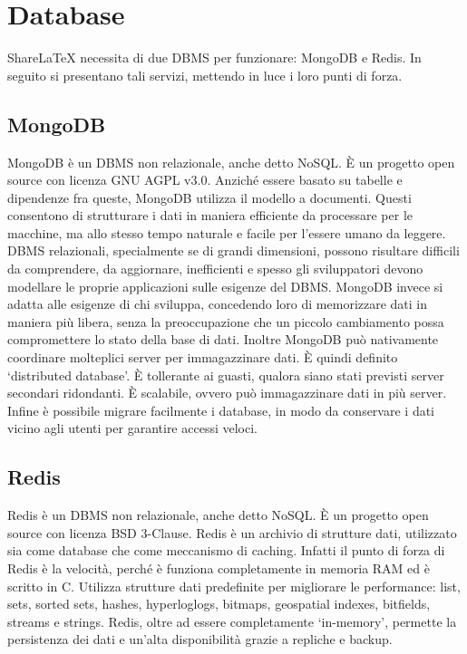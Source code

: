 \section{Database}
ShareLaTeX necessita di due DBMS per funzionare: MongoDB e Redis. In seguito si presentano tali servizi, mettendo in luce i loro punti di forza.

\subsection{MongoDB}
MongoDB è un DBMS non relazionale, anche detto NoSQL. È un progetto open source con licenza GNU AGPL v3.0. Anziché essere basato su tabelle e dipendenze fra queste, MongoDB utilizza il modello a documenti. Questi consentono di strutturare i dati in maniera efficiente da processare per le macchine, ma allo stesso tempo naturale e facile per l'essere umano da leggere. DBMS relazionali, specialmente se di grandi dimensioni, possono risultare difficili da comprendere, da aggiornare, inefficienti e spesso gli sviluppatori devono modellare le proprie applicazioni sulle esigenze del DBMS. MongoDB invece si adatta alle esigenze di chi sviluppa, concedendo loro di memorizzare dati in maniera più libera, senza la preoccupazione che un piccolo cambiamento possa compromettere lo stato della base di dati. Inoltre MongoDB può nativamente coordinare molteplici server per immagazzinare dati. È quindi definito \enquote*{distributed database}. È tollerante ai guasti, qualora siano stati previsti server secondari ridondanti. È scalabile, ovvero può immagazzinare dati in più server. Infine è possibile migrare facilmente i database, in modo da conservare i dati vicino agli utenti per garantire accessi veloci.

\subsection{Redis}
Redis è un DBMS non relazionale, anche detto NoSQL. È un progetto open source con licenza BSD 3-Clause. Redis è un archivio di strutture dati, utilizzato sia come database che come meccanismo di caching. Infatti il punto di forza di Redis è la velocità, perché è funziona completamente in memoria RAM ed è scritto in C. Utilizza strutture dati predefinite per migliorare le performance: list, sets, sorted sets, hashes, hyperloglogs, bitmaps, geospatial indexes, bitfields, streams e strings. Redis, oltre ad essere completamente \enquote*{in-memory}, permette la persistenza dei dati e un'alta disponibilità grazie a repliche e backup.


